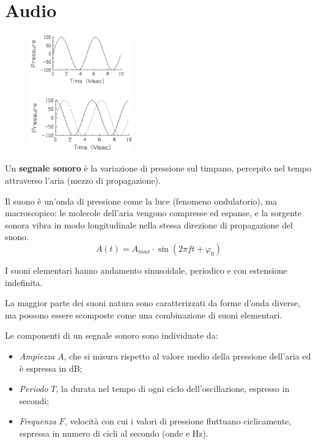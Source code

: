 \section{Audio}

 \begin{figure}
	\vspace{-50pt}
	\includegraphics[width=0.4\textwidth]{Lezioni/Immagini/ondepressione}
	\vspace{-50pt}
\end{figure}

Un \textbf{segnale sonoro} è la variazione di pressione sul timpano, percepito nel tempo attraverso l'aria (mezzo di propagazione). 

Il suono è un'onda di pressione come la luce (fenomeno ondulatorio), ma macroscopico: le molecole dell'aria vengono compresse ed espanse, e la sorgente sonora vibra in modo longitudinale nella stessa direzione di propagazione del suono.
$$A(t) = A_{max} \cdot \sin(2\pi ft + \varphi_0)$$

I suoni elementari hanno andamento sinusoidale, periodico e con estensione indefinita. 

La maggior parte dei suoni natura sono caratterizzati da forme d'onda diverse, ma possono essere scomposte come una combinazione di suoni elementari.

Le componenti di un segnale sonoro sono individuate da:
\begin{itemize}
	\item \textit{Ampiezza} $A$, che si misura rispetto al valore medio della pressione dell'aria ed è espressa in dB;
	\item \textit{Periodo} $T$, la durata nel tempo di ogni ciclo dell'oscillazione, espresso in secondi;
	\item \textit{Frequenza} $F$, velocità con cui i valori di pressione fluttuano ciclicamente, espressa in numero di cicli al secondo (onde e Hz).
\end{itemize}

